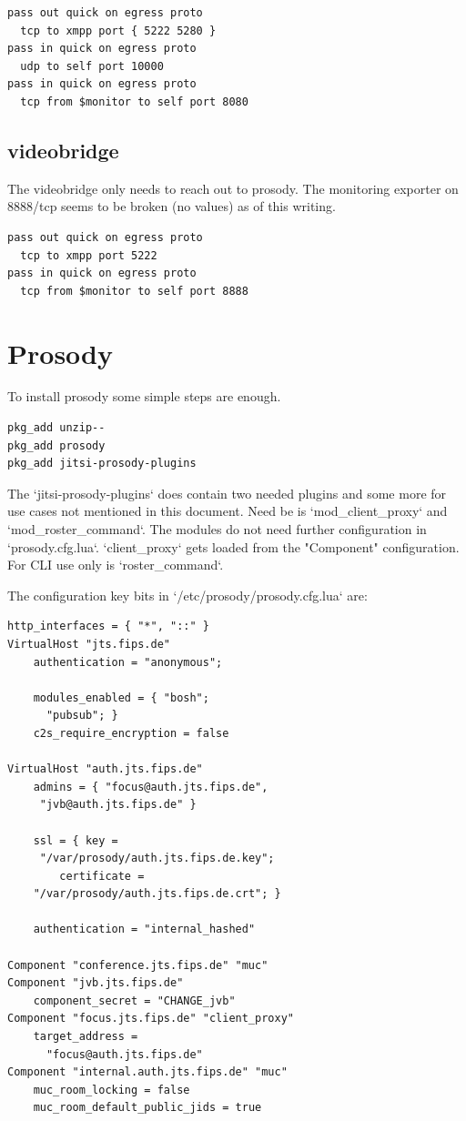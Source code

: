 \documentclass[10pt,conference]{IEEEtran}
\begin{document}
\begin{verbatim}
pass out quick on egress proto
  tcp to xmpp port { 5222 5280 }
pass in quick on egress proto
  udp to self port 10000
pass in quick on egress proto
  tcp from $monitor to self port 8080
\end{verbatim}

\subsection{videobridge}
The videobridge only needs to reach out to prosody. The monitoring exporter on 8888/tcp
seems to be broken (no values) as of this writing.
\begin{verbatim}
pass out quick on egress proto
  tcp to xmpp port 5222
pass in quick on egress proto
  tcp from $monitor to self port 8888
\end{verbatim}

\section{Prosody}
To install prosody some simple steps are enough.

\begin{verbatim}
pkg_add unzip--
pkg_add prosody
pkg_add jitsi-prosody-plugins
\end{verbatim}

The `jitsi-prosody-plugins` does contain two needed plugins and some more for use
cases not mentioned in this document. Need be is `mod_client_proxy` and `mod_roster_command`.
The modules do not need further configuration in `prosody.cfg.lua`.
`client_proxy` gets loaded from the "Component" configuration.
For CLI use only is `roster_command`.

The configuration key bits in `/etc/prosody/prosody.cfg.lua` are:

\begin{verbatim}
http_interfaces = { "*", "::" }
VirtualHost "jts.fips.de"
    authentication = "anonymous";

    modules_enabled = { "bosh";
      "pubsub"; }
    c2s_require_encryption = false

VirtualHost "auth.jts.fips.de"
    admins = { "focus@auth.jts.fips.de",
     "jvb@auth.jts.fips.de" }

    ssl = { key =
     "/var/prosody/auth.jts.fips.de.key";
        certificate =
    "/var/prosody/auth.jts.fips.de.crt"; }

    authentication = "internal_hashed"

Component "conference.jts.fips.de" "muc"
Component "jvb.jts.fips.de"
    component_secret = "CHANGE_jvb"
Component "focus.jts.fips.de" "client_proxy"
    target_address =
      "focus@auth.jts.fips.de"
Component "internal.auth.jts.fips.de" "muc"
    muc_room_locking = false
    muc_room_default_public_jids = true
\end{verbatim}
\end{document}
